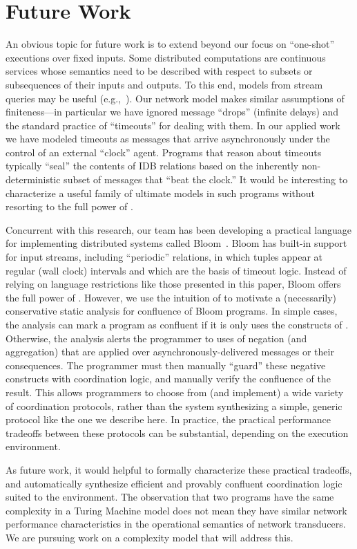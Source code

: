 \section{Future Work}
\label{sec:conclusion}

An obvious topic for future work is to extend beyond our focus on ``one-shot'' executions over fixed inputs.  
Some distributed computations are continuous services whose semantics need to be described with respect to subsets or subsequences of their inputs and outputs.  To this end, models from stream queries may be useful (e.g.,~\cite{Chandramouli2009}).  
Our network model makes similar assumptions of finiteness---in particular we have ignored message ``drops'' (infinite delays) and the standard practice of ``timeouts'' for dealing with them.  In our applied work~\cite{boom,cidr11} we have modeled timeouts as messages that arrive asynchronously under the control of an external ``clock'' agent.  Programs that reason about timeouts typically ``seal'' the contents of IDB relations based on the inherently non-deterministic subset of messages that ``beat the clock.''  It would be interesting to characterize a useful family of ultimate models in such programs without resorting to the full power of \lang.

Concurrent with this research, our team has been developing a practical language for implementing distributed
systems called Bloom~\cite{bloom}.  Bloom has built-in support for input streams, including ``periodic'' relations,
in which tuples appear at regular (wall clock) intervals and which are the basis of timeout logic.
Instead of relying on language restrictions like those presented in this paper, Bloom offers the full power of \lang.  However, we use the intuition of \plang to motivate a (necessarily) conservative static analysis for confluence of Bloom programs.  In simple cases, the analysis can mark a program as confluent if it is only uses the constructs of \slang.  Otherwise, the analysis alerts the programmer to uses of negation (and aggregation) that are applied over asynchronously-delivered messages or their consequences.  The programmer must then manually ``guard'' these negative constructs with coordination logic, and manually verify the confluence of the result.
This allows programmers to choose from (and implement) a wide variety of coordination protocols, rather than the system synthesizing a simple, generic protocol like the one we describe here.  
In practice, the practical performance tradeoffs between these protocols can be substantial, depending on the execution environment.  

As future work, it would helpful to formally characterize these practical tradeoffs, and automatically synthesize efficient and provably confluent coordination logic suited to the environment.
The observation that two programs have the same complexity in a Turing Machine model does not mean they have similar network performance characteristics in the operational semantics of network transducers.  We are pursuing work on a complexity model that will address this.
